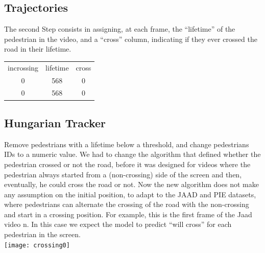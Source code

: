 \documentclass[11pt]{article}
\begin{document}
\subsection*{Trajectories}
    The second Step consists in assigning, at each frame, the ``lifetime'' of the pedestrian in the video, and a ``cross'' column, indicating if they
    ever crossed the road in their lifetime.
    \begin{center}
    \begin{tabular}{ c c c}
     incrossing & lifetime & cross\\
     0 & 568 & 0\\
     0 & 568 & 0\\
    \end{tabular}
    \end{center}

\subsection*{Hungarian Tracker}
    Remove pedestrians with a lifetime below a threshold, and change pedestrians IDs to a numeric value.
    We had to change the algorithm that defined whether the pedestrian crossed or not the road, before it was designed for
    videos where the pedestrian always started from a (non-crossing) side of the screen and then, eventually, he could cross the road
    or not.
    Now the new algorithm does not make any assumption on the initial position, to adapt to the JAAD and PIE datasets, where
    pedestrians can alternate the crossing of the road with the non-crossing and start in a crossing position.
    For example, this is the first frame of the Jaad video n. In this case we expect the model to predict ``will cross''
    for each pedestrian in the screen.\\
    \texttt{[image: crossing0]}\\
\end{document}

